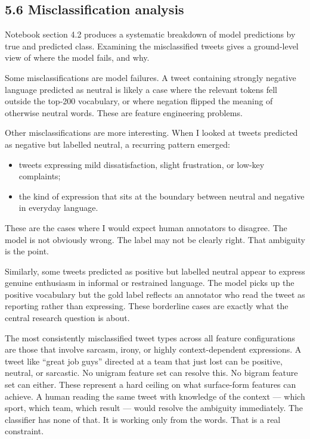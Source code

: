\documentclass[12pt]{article}
\begin{document}
\subsection*{5.6 Misclassification analysis}

Notebook section 4.2 produces a systematic breakdown of model predictions by true and predicted class. Examining the misclassified tweets gives a ground-level view of where the model fails, and why.

Some misclassifications are model failures. A tweet containing strongly negative language predicted as neutral is likely a case where the relevant tokens fell outside the top-200 vocabulary, or where negation flipped the meaning of otherwise neutral words. These are feature engineering problems.

Other misclassifications are more interesting. When I looked at tweets predicted as negative but labelled neutral, a recurring pattern emerged:
\begin{itemize}
  \item tweets expressing mild dissatisfaction, slight frustration, or low-key complaints;
  \item the kind of expression that sits at the boundary between neutral and negative in everyday language.
\end{itemize} These are the cases where I would expect human annotators to disagree. The model is not obviously wrong. The label may not be clearly right. That ambiguity is the point.

Similarly, some tweets predicted as positive but labelled neutral appear to express genuine enthusiasm in informal or restrained language. The model picks up the positive vocabulary but the gold label reflects an annotator who read the tweet as reporting rather than expressing. These borderline cases are exactly what the central research question is about.

The most consistently misclassified tweet types across all feature configurations are those that involve sarcasm, irony, or highly context-dependent expressions. A tweet like ``great job guys'' directed at a team that just lost can be positive, neutral, or sarcastic. No unigram feature set can resolve this. No bigram feature set can either. These represent a hard ceiling on what surface-form features can achieve. A human reading the same tweet with knowledge of the context --- which sport, which team, which result --- would resolve the ambiguity immediately. The classifier has none of that. It is working only from the words. That is a real constraint.
\end{document}
